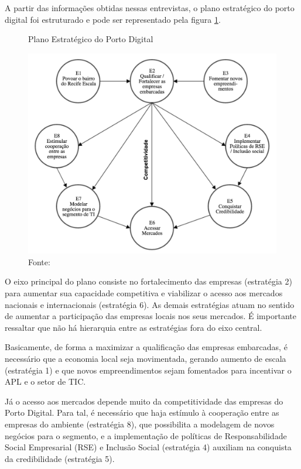 A partir das informações obtidas nessas entrevistas, o plano estratégico do porto digital foi estruturado e pode ser representado pela figura \ref{fig:estrategiasPD}.

\begin{figure}[h]
\caption{Plano Estratégico do Porto Digital}
\centerline{\includegraphics[scale=0.5]{img/estrategiasPD}}
\label{fig:estrategiasPD}
\caption* {Fonte: }
\end{figure}

O eixo principal do plano consiste no fortalecimento das empresas (estratégia 2) para aumentar sua capacidade competitiva e viabilizar o acesso aos mercados nacionais e internacionais (estratégia 6). As demais estratégias atuam no sentido de aumentar a participação das empresas locais nos seus mercados. É importante ressaltar que não há hierarquia entre as estratégias fora do eixo central.

Basicamente, de forma a maximizar a qualificação das empresas embarcadas, é necessário que a economia local seja movimentada, gerando aumento de escala (estratégia 1) e que novos empreendimentos sejam fomentados para incentivar o APL e o setor de TIC. 

Já o acesso aos mercados depende muito da competitividade das empresas do Porto Digital. Para tal, é necessário que haja estímulo à cooperação entre as empresas do ambiente (estratégia 8), que possibilita a modelagem de novos negócios para o segmento, e a implementação de políticas de Responsabilidade Social Empresarial (RSE) e Inclusão Social (estratégia 4) auxiliam na conquista da credibilidade (estratégia 5).

